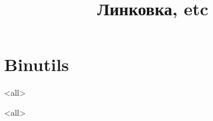 
\title{Линковка, etc}



\begin{frame}
  \frametitle{}
  \titlepage
\end{frame}
\section{Binutils}

\model<all>{}

\model<all>{}



